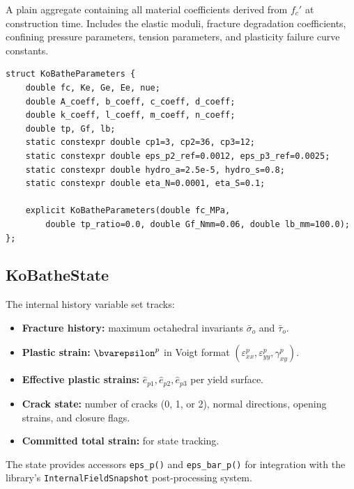 A plain aggregate containing all material coefficients derived from $f_c'$
at construction time.  Includes the elastic moduli, fracture degradation
coefficients, confining pressure parameters, tension parameters, and
plasticity failure curve constants.

\begin{lstlisting}
struct KoBatheParameters {
    double fc, Ke, Ge, Ee, nue;
    double A_coeff, b_coeff, c_coeff, d_coeff;
    double k_coeff, l_coeff, m_coeff, n_coeff;
    double tp, Gf, lb;
    static constexpr double cp1=3, cp2=36, cp3=12;
    static constexpr double eps_p2_ref=0.0012, eps_p3_ref=0.0025;
    static constexpr double hydro_a=2.5e-5, hydro_s=0.8;
    static constexpr double eta_N=0.0001, eta_S=0.1;

    explicit KoBatheParameters(double fc_MPa,
        double tp_ratio=0.0, double Gf_Nmm=0.06, double lb_mm=100.0);
};
\end{lstlisting}

\subsection{KoBatheState}
\label{ssec:kb-state-class}

The internal history variable set tracks:

\begin{itemize}
  \item \textbf{Fracture history:} maximum octahedral invariants
        $\bar\sigma_o$ and $\bar\tau_o$.
  \item \textbf{Plastic strain:} $\bvarepsilon^p$ in Voigt format
        $(\varepsilon_{xx}^p, \varepsilon_{yy}^p, \gamma_{xy}^p)$.
  \item \textbf{Effective plastic strains:} $\hat{e}_{p1}, \hat{e}_{p2},
        \hat{e}_{p3}$ per yield surface.
  \item \textbf{Crack state:} number of cracks (0, 1, or 2), normal
        directions, opening strains, and closure flags.
  \item \textbf{Committed total strain:} for state tracking.
\end{itemize}

\noindent The state provides accessors \texttt{eps\_p()} and
\texttt{eps\_bar\_p()} for integration with the library's
\texttt{InternalFieldSnapshot} post-processing system.

